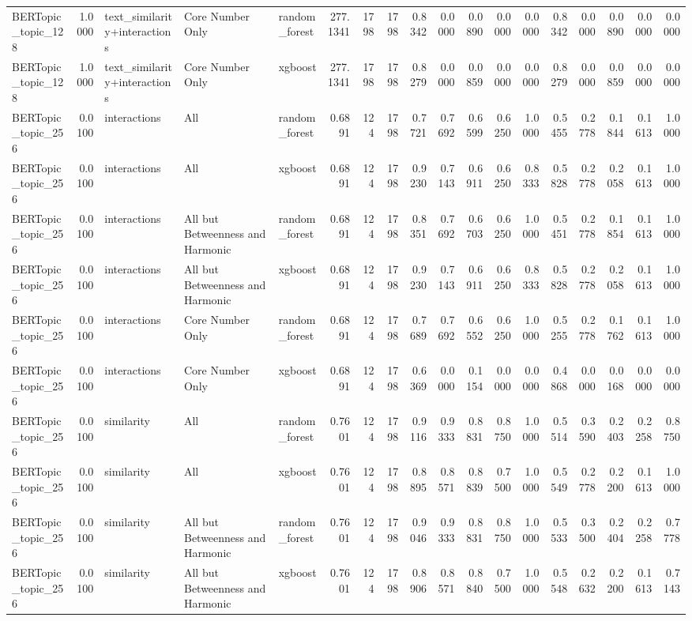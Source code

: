 \begin{tabular}{lrlllrrrrrrrrrrrrr}
BERTopic_topic_128 & 1.0000 & text_similarity+interactions & Core Number Only & random_forest & 277.1341 & 1798 & 1798 & 0.8342 & 0.0000 & 0.0890 & 0.0000 & 0.0000 & 0.8342 & 0.0000 & 0.0890 & 0.0000 & 0.0000 \\
BERTopic_topic_128 & 1.0000 & text_similarity+interactions & Core Number Only & xgboost & 277.1341 & 1798 & 1798 & 0.8279 & 0.0000 & 0.0859 & 0.0000 & 0.0000 & 0.8279 & 0.0000 & 0.0859 & 0.0000 & 0.0000 \\
BERTopic_topic_256 & 0.0100 & interactions & All & random_forest & 0.6891 & 124 & 1798 & 0.7721 & 0.7692 & 0.6599 & 0.6250 & 1.0000 & 0.5455 & 0.2778 & 0.1844 & 0.1613 & 1.0000 \\
BERTopic_topic_256 & 0.0100 & interactions & All & xgboost & 0.6891 & 124 & 1798 & 0.9230 & 0.7143 & 0.6911 & 0.6250 & 0.8333 & 0.5828 & 0.2778 & 0.2058 & 0.1613 & 1.0000 \\
BERTopic_topic_256 & 0.0100 & interactions & All but Betweenness and Harmonic & random_forest & 0.6891 & 124 & 1798 & 0.8351 & 0.7692 & 0.6703 & 0.6250 & 1.0000 & 0.5451 & 0.2778 & 0.1854 & 0.1613 & 1.0000 \\
BERTopic_topic_256 & 0.0100 & interactions & All but Betweenness and Harmonic & xgboost & 0.6891 & 124 & 1798 & 0.9230 & 0.7143 & 0.6911 & 0.6250 & 0.8333 & 0.5828 & 0.2778 & 0.2058 & 0.1613 & 1.0000 \\
BERTopic_topic_256 & 0.0100 & interactions & Core Number Only & random_forest & 0.6891 & 124 & 1798 & 0.7689 & 0.7692 & 0.6552 & 0.6250 & 1.0000 & 0.5255 & 0.2778 & 0.1762 & 0.1613 & 1.0000 \\
BERTopic_topic_256 & 0.0100 & interactions & Core Number Only & xgboost & 0.6891 & 124 & 1798 & 0.6369 & 0.0000 & 0.1154 & 0.0000 & 0.0000 & 0.4868 & 0.0000 & 0.0168 & 0.0000 & 0.0000 \\
BERTopic_topic_256 & 0.0100 & similarity & All & random_forest & 0.7601 & 124 & 1798 & 0.9116 & 0.9333 & 0.8831 & 0.8750 & 1.0000 & 0.5514 & 0.3590 & 0.2403 & 0.2258 & 0.8750 \\
BERTopic_topic_256 & 0.0100 & similarity & All & xgboost & 0.7601 & 124 & 1798 & 0.8895 & 0.8571 & 0.8839 & 0.7500 & 1.0000 & 0.5549 & 0.2778 & 0.2200 & 0.1613 & 1.0000 \\
BERTopic_topic_256 & 0.0100 & similarity & All but Betweenness and Harmonic & random_forest & 0.7601 & 124 & 1798 & 0.9046 & 0.9333 & 0.8831 & 0.8750 & 1.0000 & 0.5533 & 0.3500 & 0.2404 & 0.2258 & 0.7778 \\
BERTopic_topic_256 & 0.0100 & similarity & All but Betweenness and Harmonic & xgboost & 0.7601 & 124 & 1798 & 0.8906 & 0.8571 & 0.8840 & 0.7500 & 1.0000 & 0.5548 & 0.2632 & 0.2200 & 0.1613 & 0.7143 \\

\end{tabular}
